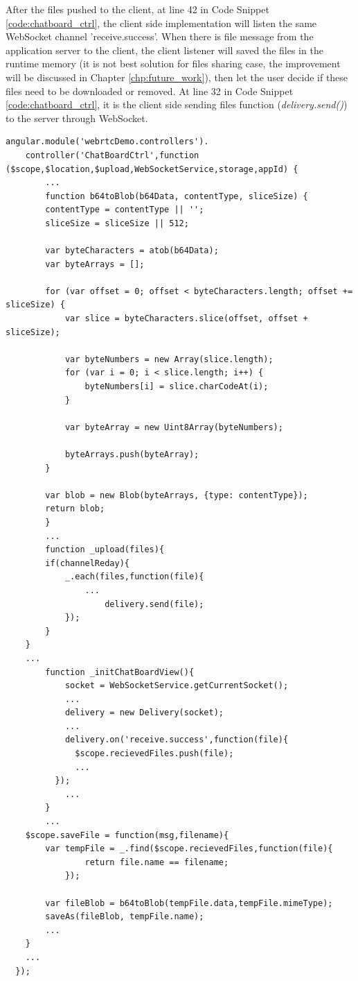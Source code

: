 \par After the files pushed to the client, at line 42 in Code Snippet \ref{code:chatboard_ctrl}, the client side implementation will listen the same WebSocket channel 'receive.success'. When there is file message from the application server to the client, the client listener will saved the files in the runtime memory (it is not best solution for files sharing case, the improvement will be discussed in Chapter \ref{chp:future_work}), then let the user decide if these files need to be downloaded or removed. At line 32 in Code Snippet \ref{code:chatboard_ctrl}, it is the client side sending files function (\textit{delivery.send()}) to the server through WebSocket.

\begin{lstlisting}[caption={Files Sharing in ChatBoardCtrl.js},label={code:chatboard_ctrl}]
angular.module('webrtcDemo.controllers').
	controller('ChatBoardCtrl',function ($scope,$location,$upload,WebSocketService,storage,appId) {
		...
		function b64toBlob(b64Data, contentType, sliceSize) {
	    contentType = contentType || '';
	    sliceSize = sliceSize || 512;

	    var byteCharacters = atob(b64Data);
	    var byteArrays = [];

	    for (var offset = 0; offset < byteCharacters.length; offset += sliceSize) {
	        var slice = byteCharacters.slice(offset, offset + sliceSize);

	        var byteNumbers = new Array(slice.length);
	        for (var i = 0; i < slice.length; i++) {
	            byteNumbers[i] = slice.charCodeAt(i);
	        }

	        var byteArray = new Uint8Array(byteNumbers);

	        byteArrays.push(byteArray);
	    }

	    var blob = new Blob(byteArrays, {type: contentType});
	    return blob;
		}
        ...
		function _upload(files){
  		if(channelReday){
  			_.each(files,function(file){
  				...
					delivery.send(file);
  			});
  		}
  	}
  	...
		function _initChatBoardView(){
			socket = WebSocketService.getCurrentSocket();
			...
			delivery = new Delivery(socket);
			...
			delivery.on('receive.success',function(file){
	          $scope.recievedFiles.push(file);
	          ...	    
	      });
			...
		}
		...
  	$scope.saveFile = function(msg,filename){
  		var tempFile = _.find($scope.recievedFiles,function(file){
				return file.name == filename;
			});

  		var fileBlob = b64toBlob(tempFile.data,tempFile.mimeType);
  		saveAs(fileBlob, tempFile.name);
  		...
  	}
  	...
  });
\end{lstlisting}


